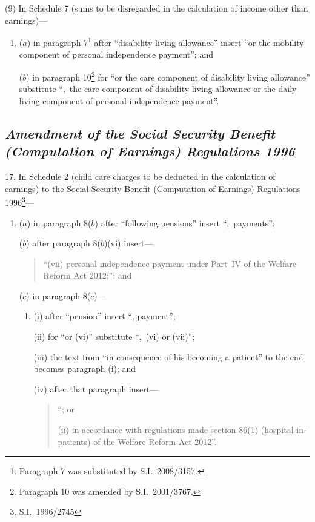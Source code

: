 \documentclass[12pt,a4paper]{article}
\begin{document}
(9) In Schedule 7 (sums to be disregarded in the calculation of income other than earnings)—
\begin{enumerate}\item[]
($a$) in paragraph 7\footnote{Paragraph 7 was substituted by S.I.~2008/3157.} after “disability living allowance” insert “or the mobility component of personal independence payment”; and

($b$) in paragraph 10\footnote{Paragraph 10 was amended by S.I.~2001/3767.} for “or the care component of disability living allowance” substitute “,~the care component of disability living allowance or the daily living component of personal independence payment”.
\end{enumerate}

\subsection*{\itshape Amendment of the Social Security Benefit (Computation of Earnings) Regulations 1996}

17.  In Schedule 2 (child care charges to be deducted in the calculation of earnings) to the Social Security Benefit (Computation of Earnings) Regulations 1996\footnote{S.I.~1996/2745}—
\begin{enumerate}\item[]
($a$) in paragraph 8($b$)  after “following pensions” insert “,~payments”;

($b$) after paragraph 8($b$)(vi)  insert—
\begin{quotation}
“(vii) personal independence payment under Part~IV of the Welfare Reform Act 2012;”; and
\end{quotation}

($c$) in paragraph 8($c$)—
\begin{enumerate}\item[]
(i) after ``pension'' insert ``, payment'';

(ii) for “or (vi)” substitute “,~(vi)  or (vii)”;

(iii) the text from “in consequence of his becoming a patient” to the end becomes paragraph (i); and

(iv) after that paragraph insert—
\begin{quotation}
“; or

(ii) in accordance with regulations made section 86(1) (hospital in-patients) of the Welfare Reform Act 2012”.
\end{quotation}
\end{enumerate}
\end{enumerate}
\end{document}
